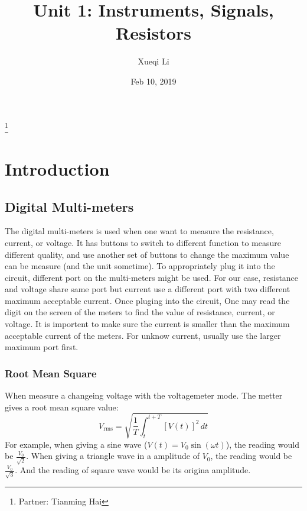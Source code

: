 \documentclass[aps,prl,reprint]{revtex4-1}
\begin{document}
\title{Unit 1: Instruments, Signals, Resistors}
\author{Xueqi Li}
\thanks{Partner: Tianming Hai}
\noaffiliation
\date{Feb 10, 2019}



\maketitle

\section{Introduction}  
    \subsection{Digital Multi-meters}
    
    The digital multi-meters is used when one want to measure the resistance, current, or voltage. It has buttons to switch to different function to measure different quality, and use another set of buttons to change the maximum value can be measure (and the unit sometime). To appropriately plug it into the circuit, different port on the multi-meters might be used. For our case, resistance and voltage share same port but current use a different port with two different maximum acceptable current. Once pluging into the circuit, One may read the digit on the screen of the meters to find the value of resistance, current, or voltage. It is importent to make sure the current is smaller than the maximum acceptable current of the meters. For unknow current, usually use the larger maximum port first.

        \subsubsection{Root Mean Square}
        When measure a changeing voltage with the voltagemeter mode. The metter gives a root mean square value:
        \[
            V_{\text{rms}} = \sqrt {\frac{1}{T} {\int_{t}^{t + T} {[V(t)]}^2\, dt}}
        \]
        For example, when giving a sine wave ($V(t) = V_0 \sin(\omega t)$), the reading would be $\frac{V_0}{\sqrt{2}}$. When giving a triangle wave in a amplitude of $V_0$, the reading would be $\frac{V_0}{\sqrt{3}}$. And the reading of square wave would be its origina amplitude.
\end{document}
